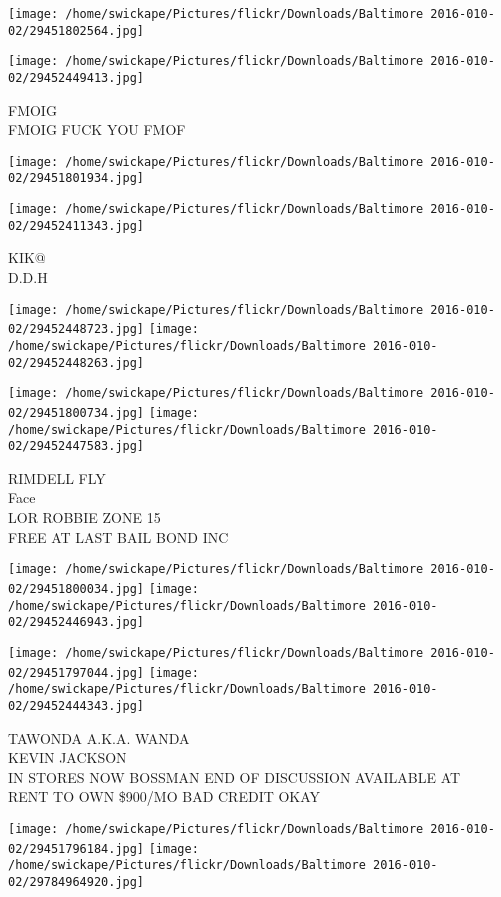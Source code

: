\documentclass[10pt,letterpaper]{article}
\begin{document}
\texttt{[image: /home/swickape/Pictures/flickr/Downloads/Baltimore 2016-010-02/29451802564.jpg]}

\vspace{0.25in}
\texttt{[image: /home/swickape/Pictures/flickr/Downloads/Baltimore 2016-010-02/29452449413.jpg]}

FMOIG\\
FMOIG FUCK YOU FMOF
\pagebreak

\texttt{[image: /home/swickape/Pictures/flickr/Downloads/Baltimore 2016-010-02/29451801934.jpg]}

\vspace{0.25in}
\texttt{[image: /home/swickape/Pictures/flickr/Downloads/Baltimore 2016-010-02/29452411343.jpg]}

KIK@\\
D.D.H
\pagebreak

\texttt{[image: /home/swickape/Pictures/flickr/Downloads/Baltimore 2016-010-02/29452448723.jpg]}
\texttt{[image: /home/swickape/Pictures/flickr/Downloads/Baltimore 2016-010-02/29452448263.jpg]}

\texttt{[image: /home/swickape/Pictures/flickr/Downloads/Baltimore 2016-010-02/29451800734.jpg]}
\texttt{[image: /home/swickape/Pictures/flickr/Downloads/Baltimore 2016-010-02/29452447583.jpg]}

RIMDELL FLY\\
Face\\
LOR ROBBIE ZONE 15\\
FREE AT LAST BAIL BOND INC
\pagebreak

\texttt{[image: /home/swickape/Pictures/flickr/Downloads/Baltimore 2016-010-02/29451800034.jpg]}
\texttt{[image: /home/swickape/Pictures/flickr/Downloads/Baltimore 2016-010-02/29452446943.jpg]}

\texttt{[image: /home/swickape/Pictures/flickr/Downloads/Baltimore 2016-010-02/29451797044.jpg]}
\texttt{[image: /home/swickape/Pictures/flickr/Downloads/Baltimore 2016-010-02/29452444343.jpg]}

TAWONDA A.K.A. WANDA\\
KEVIN JACKSON\\
IN STORES NOW BOSSMAN END OF DISCUSSION AVAILABLE AT\\
RENT TO OWN \$900/MO BAD CREDIT OKAY
\pagebreak

\texttt{[image: /home/swickape/Pictures/flickr/Downloads/Baltimore 2016-010-02/29451796184.jpg]}
\texttt{[image: /home/swickape/Pictures/flickr/Downloads/Baltimore 2016-010-02/29784964920.jpg]}
\end{document}
